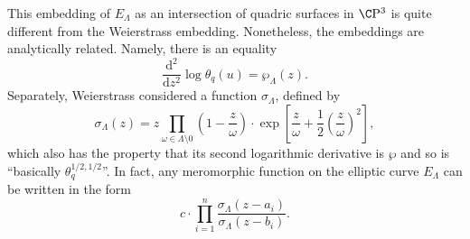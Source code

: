 \begin{remark}\label{EllipticFunctionsHaveWeierstrassPresentation}
This embedding of \(E_\Lambda\) as an intersection of quadric surfaces in \(\CP^3\) is quite different from the Weierstrass embedding.
Nonetheless, the embeddings are analytically related.
Namely, there is an equality \[\frac{\mathrm d^2}{\mathrm dz^2} \log \theta_q(u) = \wp_\Lambda(z).\]
Separately, Weierstrass considered a function \(\sigma_\Lambda\), defined by \[\sigma_\Lambda(z) = z \prod_{\omega \in \Lambda \setminus 0} \left( 1 - \frac{z}{\omega} \right) \cdot \exp \left[ \frac{z}{\omega} + \frac{1}{2} \left( \frac{z}{\omega} \right)^2 \right],\] which also has the property that its second logarithmic derivative is \(\wp\) and so is ``basically \(\theta_q^{1/2,1/2}\)''.
In fact, any meromorphic function on the elliptic curve $E_\Lambda$ can be written in the form \[c \cdot \prod_{i=1}^n \frac{\sigma_\Lambda(z - a_i)}{\sigma_\Lambda(z - b_i)}.\]
\end{remark}

